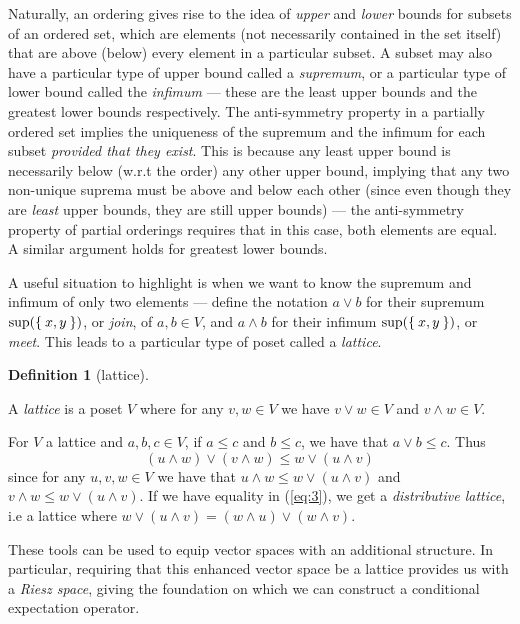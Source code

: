 \documentclass[letterpaper,10pt,oneside,onecolumn,reqno]{amsart}
\theoremstyle{definition}
\newtheorem{defn}{Definition}
\newcommand{\meet}{\wedge}
\newcommand{\join}{\vee}
\begin{document}
  Naturally, an ordering gives rise to the idea of \emph{upper} and
  \emph{lower} bounds for subsets of an ordered set, which are
  elements (not necessarily contained in the set itself) that are
  above (below) every element in a particular subset. A subset may
  also have a particular type of upper bound called a \emph{supremum},
  or a particular type of lower bound called the \emph{infimum} ---
  these are the least upper bounds and the greatest lower bounds
  respectively. The anti-symmetry property in a partially ordered set
  implies the uniqueness of the supremum and the infimum for each
  subset \emph{provided that they exist}. This is because any least
  upper bound is necessarily below (w.r.t the order) any other upper
  bound, implying that any two non-unique suprema must be above and
  below each other (since even though they are \emph{least} upper
  bounds, they are still upper bounds) --- the anti-symmetry property
  of partial orderings requires that in this case, both elements are
  equal. A similar argument holds for greatest lower bounds.

  A useful situation to highlight is when we want to know the supremum
  and infimum of only two elements --- define the notation $a \join b$
  for their supremum $\sup(\Set{x,y})$, or \emph{join}, of $a,b \in
  V$, and $a \meet b$ for their infimum $\sup(\Set{x,y})$, or
  \emph{meet}. This leads to a particular type of poset called a
  \emph{lattice}.



  \begin{defn}[lattice]\label{def:2}

    A \emph{lattice} is a poset $V$ where for any $v,w
    \in V$ we have $v \join w \in V$ and $v \meet w \in V$.

  \end{defn}


  For $V$ a lattice and $a,b,c \in V$, if $a \leq c $ and $b \leq c $,
  we have that $a \join b \leq c $. Thus
  \begin{equation}
    \label{eq:3}
    (u \meet w) \join (v \meet w) \leq w \join (u \meet v)
  \end{equation}
  since for any $u,v,w \in V$ we have that $u \meet w \leq w \join (u
  \meet v)$ and $v \meet w \leq w \join (u \meet v)$. If we have
  equality in (\ref{eq:3}), we get a \emph{distributive lattice}, i.e a lattice where $w \join (u
  \meet v) = (w \meet u) \join (w \meet v)$.

  These tools can be used to equip vector spaces with an additional
  structure. In particular, requiring that this enhanced vector space
  be a lattice provides us with a \emph{Riesz space}, giving the
  foundation on which we can construct a conditional expectation
  operator.
\end{document}
